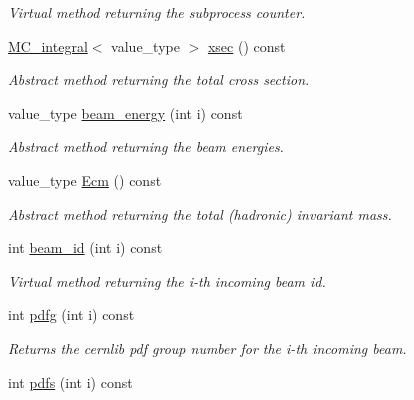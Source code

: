 \begin{DoxyCompactItemize}
\begin{DoxyCompactList}\small\item\em Virtual method returning the subprocess counter. \end{DoxyCompactList}\item 
\hypertarget{a00444_a185cb10de7f8354a746fd757829942f3}{\hyperlink{a00363}{M\-C\-\_\-integral}$<$ value\-\_\-type $>$ \hyperlink{a00444_a185cb10de7f8354a746fd757829942f3}{xsec} () const }\label{a00444_a185cb10de7f8354a746fd757829942f3}

\begin{DoxyCompactList}\small\item\em Abstract method returning the total cross section. \end{DoxyCompactList}\item 
\hypertarget{a00444_a1dc3a6e29880a81f5ea7e25f9030a88d}{value\-\_\-type \hyperlink{a00444_a1dc3a6e29880a81f5ea7e25f9030a88d}{beam\-\_\-energy} (int i) const }\label{a00444_a1dc3a6e29880a81f5ea7e25f9030a88d}

\begin{DoxyCompactList}\small\item\em Abstract method returning the beam energies. \end{DoxyCompactList}\item 
\hypertarget{a00444_ac3b9dc4b12faf73ae5e405d1abff79e1}{value\-\_\-type \hyperlink{a00444_ac3b9dc4b12faf73ae5e405d1abff79e1}{Ecm} () const }\label{a00444_ac3b9dc4b12faf73ae5e405d1abff79e1}

\begin{DoxyCompactList}\small\item\em Abstract method returning the total (hadronic) invariant mass. \end{DoxyCompactList}\item 
\hypertarget{a00444_a6f480161dcbc65da52d00028021d0bc4}{int \hyperlink{a00444_a6f480161dcbc65da52d00028021d0bc4}{beam\-\_\-id} (int i) const }\label{a00444_a6f480161dcbc65da52d00028021d0bc4}

\begin{DoxyCompactList}\small\item\em Virtual method returning the i-\/th incoming beam id. \end{DoxyCompactList}\item 
\hypertarget{a00444_a3b911ea154229ac67148cd5d54ac5b64}{int \hyperlink{a00444_a3b911ea154229ac67148cd5d54ac5b64}{pdfg} (int i) const }\label{a00444_a3b911ea154229ac67148cd5d54ac5b64}

\begin{DoxyCompactList}\small\item\em Returns the cernlib pdf group number for the i-\/th incoming beam. \end{DoxyCompactList}\item 
\hypertarget{a00444_a471032c2b3043fa0775580408dd7b468}{int \hyperlink{a00444_a471032c2b3043fa0775580408dd7b468}{pdfs} (int i) const }\label{a00444_a471032c2b3043fa0775580408dd7b468}


\end{DoxyCompactItemize}
